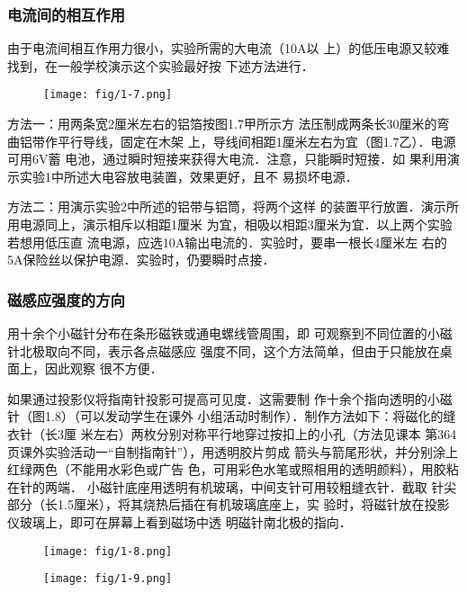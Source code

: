 \subsubsection{电流间的相互作用}
由于电流间相互作用力很小，实验所需的大电流（10A以
上）的低压电源又较难找到，在一般学校演示这个实验最好按
下述方法进行．
\begin{figure}[htp]
    \centering
\texttt{[image: fig/1-7.png]}
    \caption{}
\end{figure}

方法一：用两条宽2厘米左右的铝箔按图1.7甲所示方
法压制成两条长30厘米的弯曲铝带作平行导线，固定在木架
上，导线间相距1厘米左右为宜（图1.7乙）．电源可用6V蓄
电池，通过瞬时短接来获得大电流．注意，只能瞬时短接．如
果利用演示实验1中所述大电容放电装置，效果更好，且不
易损坏电源．

方法二：用演示实验2中所述的铝带与铝筒，将两个这样
的装置平行放置．演示所用电源同上，演示相斥以相距1厘米
为宜，相吸以相距3厘米为宜．以上两个实验若想用低压直
流电源，应选10A输出电流的．实验时，要串一根长4厘米左
右的5A保险丝以保护电源．实验时，仍要瞬时点接．

\subsubsection{磁感应强度的方向}
用十余个小磁针分布在条形磁铁或通电螺线管周围，即
可观察到不同位置的小磁针北极取向不同，表示各点磁感应
强度不同，这个方法简单，但由于只能放在桌面上，因此观察
很不方便．


如果通过投影仪将指南针投影可提高可见度．这需要制
作十余个指向透明的小磁针（图1.8）（可以发动学生在课外
小组活动时制作）．制作方法如下：将磁化的缝衣针（长3厘
米左右）两枚分别对称平行地穿过按扣上的小孔（方法见课本
第364页课外实验活动一“自制指南针”），用透明胶片剪成
箭头与箭尾形状，并分别涂上红绿两色（不能用水彩色或广告
色，可用彩色水笔或照相用的透明颜料），用胶粘在针的两端．
小磁针底座用透明有机玻璃，中间支针可用较粗缝衣针．截取
针尖部分（长1.5厘米），将其烧热后插在有机玻璃底座上，实
验时，将磁针放在投影仪玻璃上，即可在屏幕上看到磁场中透
明磁针南北极的指向．

\begin{figure}[htp]\centering
    \begin{minipage}[t]{0.48\textwidth}
    \centering
\texttt{[image: fig/1-8.png]}
    \caption{}
    \end{minipage}
    \begin{minipage}[t]{0.48\textwidth}
    \centering
\texttt{[image: fig/1-9.png]}
    \caption{}
    \end{minipage}
    \end{figure}


